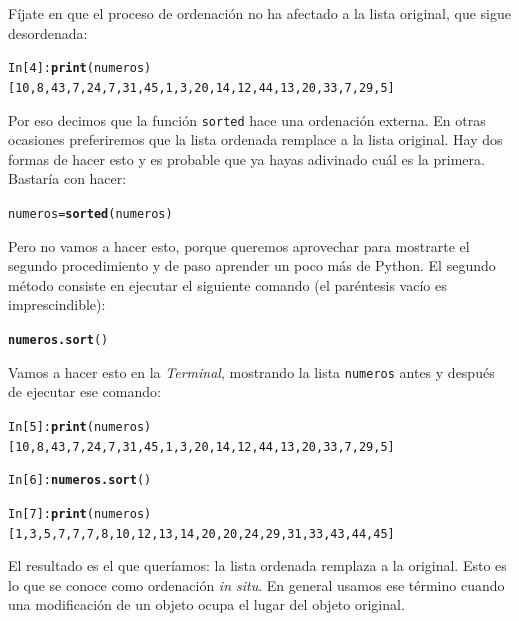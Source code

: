\documentclass[10pt,a4paper]{article}\usepackage[]{graphicx}\usepackage[]{color}
\makeatletter
\newcommand{\hlstd}[1]{\textcolor[rgb]{0.345,0.345,0.345}{#1}}%
\newcommand{\hlkwb}[1]{\textcolor[rgb]{0.69,0.353,0.396}{#1}}%
\newcommand{\hlkwd}[1]{\textcolor[rgb]{0.737,0.353,0.396}{\textbf{#1}}}%
\newenvironment{kframe}{%
 \def\at@end@of@kframe{}%
 \ifinner\ifhmode%
  \def\at@end@of@kframe{\end{minipage}}%
  \begin{minipage}{\columnwidth}%
 \fi\fi%
 \def\FrameCommand##1{\hskip\@totalleftmargin \hskip-\fboxsep
 \colorbox{shadecolor}{##1}\hskip-\fboxsep
     \hskip-\linewidth \hskip-\@totalleftmargin \hskip\columnwidth}%
 \MakeFramed {\advance\hsize-\width
   \@totalleftmargin\z@ \linewidth\hsize
   \@setminipage}}%
 {\par\unskip\endMakeFramed%
 \at@end@of@kframe}
\newenvironment{knitrout}{}{} %
\makeatother
\begin{document}
Fíjate en que el proceso de ordenación no ha afectado a la lista original, que sigue desordenada:
\begin{knitrout}
\color{fgcolor}\begin{kframe}
\begin{alltt}
In [4]: \hlkwd{print}(numeros)
[10, 8, 43, 7, 24, 7, 31, 45, 1, 3, 20, 14, 12, 44, 13, 20, 33, 7, 29, 5]
\end{alltt}
\end{kframe}
\end{knitrout}
Por eso decimos que la función {\tt sorted} hace una ordenación {\sf externa}. En otras ocasiones preferiremos que la lista ordenada remplace a la lista original. Hay dos formas de hacer esto y es probable que ya hayas adivinado cuál es la primera. Bastaría con hacer:
\begin{knitrout}
\color{fgcolor}\begin{kframe}
\begin{alltt}
\hlstd{numeros} \hlkwb{=} \hlkwd{sorted}\hlstd{(numeros)}
\end{alltt}
\end{kframe}
\end{knitrout}
Pero no vamos a hacer esto, porque queremos aprovechar para mostrarte el segundo procedimiento y de paso aprender un poco más de Python. El segundo método consiste en ejecutar el siguiente comando (el paréntesis vacío es imprescindible):
\begin{knitrout}
\color{fgcolor}\begin{kframe}
\begin{alltt}
\hlkwd{numeros.sort}\hlstd{()}
\end{alltt}
\end{kframe}
\end{knitrout}
Vamos a hacer esto en la {\em Terminal}, mostrando la lista {\tt numeros} antes y después de ejecutar ese comando:
\begin{knitrout}
\color{fgcolor}\begin{kframe}
\begin{alltt}
In [5]: \hlkwd{print}(numeros)
[10, 8, 43, 7, 24, 7, 31, 45, 1, 3, 20, 14, 12, 44, 13, 20, 33, 7, 29, 5]

In [6]: \hlkwd{numeros.sort}()

In [7]: \hlkwd{print}(numeros)
[1, 3, 5, 7, 7, 7, 8, 10, 12, 13, 14, 20, 20, 24, 29, 31, 33, 43, 44, 45]
\end{alltt}
\end{kframe}
\end{knitrout}
El resultado es el que queríamos: la lista ordenada remplaza a la original. Esto es lo que se conoce como ordenación {\em in situ}. En general usamos ese término cuando una modificación de un objeto ocupa el lugar del objeto original.
\end{document}
